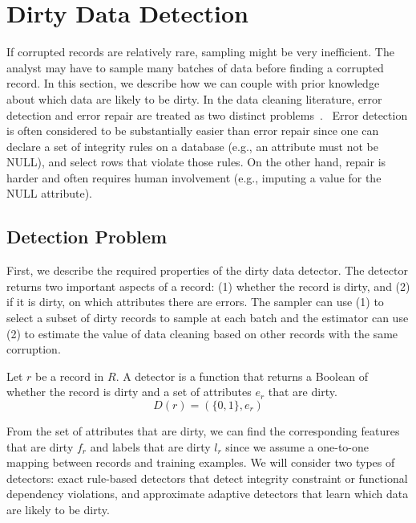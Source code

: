 \vspace{2em}
\section{Dirty Data Detection}\label{det}
If corrupted records are relatively rare, sampling might be very inefficient.
The analyst may have to sample many batches of data before finding a corrupted record.
In this section, we describe how we can couple \sys with prior knowledge about which data are likely to be dirty.
In the data cleaning literature, error detection and error repair are treated as two distinct problems~\cite{DBLP:series/synthesis/2012Fan, Dasu:2003:EDM:861869, rahm2000data}.
 Error detection is often considered to be substantially easier than error repair since one can declare a set of integrity rules on a database (e.g., an attribute must not be NULL), and select rows that violate those rules.
On the other hand, repair is harder and often requires human involvement (e.g., imputing a value for the NULL attribute).

\subsection{Detection Problem}
First, we describe the required properties of the dirty data detector.
The detector returns two important aspects of a record: 
(1) whether the record is dirty, and (2) if it is dirty, on which attributes there are errors.
The sampler can use (1) to select a subset of dirty records to sample at each batch and 
the estimator can use (2) to estimate the value of data cleaning based on other records with the same corruption.

\begin{definition}[Detector]
Let $r$ be a record in $R$. A detector is a function that returns a Boolean of whether the record is dirty and a set of attributes $e_r$ that are dirty.
\[
D(r) = (\{0,1\}, e_r)
\]
\end{definition}

From the set of attributes that are dirty, we can find the corresponding features that are dirty $f_r$ and labels that are dirty $l_r$ since we assume a one-to-one mapping between records and training examples.
We will consider two types of detectors: exact rule-based detectors that detect integrity constraint or functional dependency violations, and approximate adaptive detectors that learn which data are likely to be dirty.


